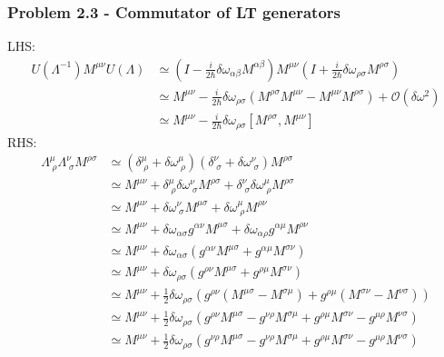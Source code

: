 \documentclass[10pt,a4paper]{article}
\theoremstyle{definition}
\begin{document}
\subsubsection{Problem 2.3 - Commutator of LT generators}
LHS:
\begin{align}
U(\Lambda^{-1})M^{\mu\nu}U(\Lambda)
&\simeq\left(I-\frac{i}{2\hbar}\delta\omega_{\alpha\beta}M^{\alpha\beta}\right)M^{\mu\nu}\left(I+\frac{i}{2\hbar}\delta\omega_{\rho\sigma}M^{\rho\sigma}\right)\\
&\simeq M^{\mu\nu}-\frac{i}{2\hbar}\delta\omega_{\rho\sigma}(M^{\rho\sigma}M^{\mu\nu}-M^{\mu\nu}M^{\rho\sigma})+\mathcal{O}(\delta\omega^2)\\
&\simeq M^{\mu\nu}-\frac{i}{2\hbar}\delta\omega_{\rho\sigma}[M^{\rho\sigma},M^{\mu\nu}]
\end{align}
RHS:
\begin{align}
\Lambda^{\mu}_{\;\rho}\Lambda^\nu_{\;\sigma}M^{\rho\sigma}
&\simeq\left(\delta^{\mu}_{\;\rho}+\delta\omega^{\mu}_{\;\rho}\right)\left(\delta^{\nu}_{\;\sigma}+\delta\omega^{\nu}_{\;\sigma}\right)M^{\rho\sigma}\\
&\simeq M^{\mu\nu}+\delta^\mu_{\;\rho}\delta\omega^\nu_{\;\sigma}M^{\rho\sigma}+\delta^\nu_{\;\sigma}\delta\omega^\mu_{\;\rho}M^{\rho\sigma}\\
&\simeq M^{\mu\nu}+\delta\omega^\nu_{\;\sigma}M^{\mu\sigma}+\delta\omega^\mu_{\;\rho}M^{\rho\nu}\\
&\simeq M^{\mu\nu}+\delta\omega_{\alpha\sigma}g^{\alpha\nu}M^{\mu\sigma}+\delta\omega_{\alpha\rho}g^{\alpha\mu}M^{\rho\nu}\\
&\simeq M^{\mu\nu}+\delta\omega_{\alpha\sigma}(g^{\alpha\nu}M^{\mu\sigma}+g^{\alpha\mu}M^{\sigma\nu})\\
&\simeq M^{\mu\nu}+\delta\omega_{\rho\sigma}(g^{\rho\nu}M^{\mu\sigma}+g^{\rho\mu}M^{\sigma\nu})\\
&\simeq M^{\mu\nu}+\frac{1}{2}\delta\omega_{\rho\sigma}\left(g^{\rho\nu}(M^{\mu\sigma}-M^{\sigma\mu})+g^{\rho\mu}(M^{\sigma\nu}-M^{\nu\sigma})\right)\\
&\simeq M^{\mu\nu}+\frac{1}{2}\delta\omega_{\rho\sigma}\left(g^{\rho\nu}M^{\mu\sigma}-g^{\nu\rho}M^{\sigma\mu}+g^{\rho\mu}M^{\sigma\nu}-g^{\mu\rho}M^{\nu\sigma}\right)\\
&\simeq M^{\mu\nu}+\frac{1}{2}\delta\omega_{\rho\sigma}\left(g^{\nu\rho}M^{\mu\sigma}-g^{\nu\rho}M^{\sigma\mu}+g^{\rho\mu}M^{\sigma\nu}-g^{\mu\rho}M^{\nu\sigma}\right)\\
\end{align}
\end{document}
